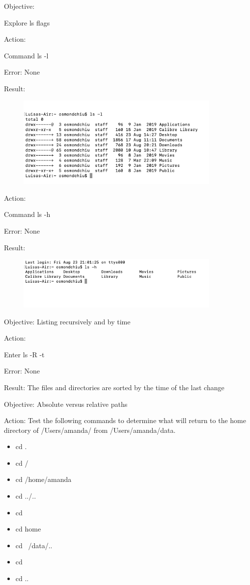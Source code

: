 \documentclass{article}
\begin{document}
Objective:\par
Explore ls flags\par
Action:\par
Command ls -l\par
Error: None\par
Result:
\begin{figure}[htp]
    \centering
    \includegraphics[width=10cm]{Screenshot.png}
    \label{fig:ls-1}
\end{figure}
 \par
Action:\par
Command ls -h\par
Error: None\par
Result: \par
\begin{figure}[htp]
    \centering
    \includegraphics[width=10cm]{Screenshot2.png}
    \label{fig:ls-2}
\end{figure}
 \par
Objective: Listing recursively and by time\par
Action:\par Enter ls -R -t \par
Error: None\par
Result: The files and directories are sorted by the time of the last change\par
Objective: Absolute versus relative paths\par
Action: Test the following commands to determine what will return to the home directory of /Users/amanda/ from /Users/amanda/data.\par
\begin{itemize}
\item cd .
\item cd /
\item cd /home/amanda
\item cd ../..
\item cd ~
\item cd home
\item cd ~/data/..
\item cd
\item cd ..
\end{itemize}
\end{document}
